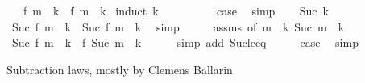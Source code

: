 \begin{isabellebody}
\ \ \ {\isachardoublequoteopen}f\ m\ {\isacharplus}{\kern0pt}\ k\ {\isasymle}\ f\ {\isacharparenleft}{\kern0pt}m\ {\isacharplus}{\kern0pt}\ k{\isacharparenright}{\kern0pt}{\isachardoublequoteclose}\isanewline
%
\isadelimproof
%
\endisadelimproof
%
\isatagproof
{}\isamarkupfalse%
\ {\isacharparenleft}{\kern0pt}induct\ k{\isacharparenright}{\kern0pt}\isanewline
\ \ \isamarkupfalse%
\ {}\isanewline
\ \ \isamarkupfalse%
\ \isamarkupfalse%
\ {\isacharquery}{\kern0pt}case\ \isamarkupfalse%
\ simp\isanewline
{}\isamarkupfalse%
\isanewline
\ \ \isamarkupfalse%
\ {\isacharparenleft}{\kern0pt}Suc\ k{\isacharparenright}{\kern0pt}\isanewline
\ \ \isamarkupfalse%
\ \isamarkupfalse%
\ {\isachardoublequoteopen}Suc\ {\isacharparenleft}{\kern0pt}f\ m\ {\isacharplus}{\kern0pt}\ k{\isacharparenright}{\kern0pt}\ {\isasymle}\ Suc\ {\isacharparenleft}{\kern0pt}f\ {\isacharparenleft}{\kern0pt}m\ {\isacharplus}{\kern0pt}\ k{\isacharparenright}{\kern0pt}{\isacharparenright}{\kern0pt}{\isachardoublequoteclose}\ \isamarkupfalse%
\ simp\isanewline
\ \ \isamarkupfalse%
\ \isamarkupfalse%
\ assms\ {\isacharbrackleft}{\kern0pt}of\ {\isachardoublequoteopen}m\ {\isacharplus}{\kern0pt}\ k{\isachardoublequoteclose}\ {\isachardoublequoteopen}Suc\ {\isacharparenleft}{\kern0pt}m\ {\isacharplus}{\kern0pt}\ k{\isacharparenright}{\kern0pt}{\isachardoublequoteclose}{\isacharbrackright}{\kern0pt}\ \isamarkupfalse%
\ {\isachardoublequoteopen}Suc\ {\isacharparenleft}{\kern0pt}f\ {\isacharparenleft}{\kern0pt}m\ {\isacharplus}{\kern0pt}\ k{\isacharparenright}{\kern0pt}{\isacharparenright}{\kern0pt}\ {\isasymle}\ f\ {\isacharparenleft}{\kern0pt}Suc\ {\isacharparenleft}{\kern0pt}m\ {\isacharplus}{\kern0pt}\ k{\isacharparenright}{\kern0pt}{\isacharparenright}{\kern0pt}{\isachardoublequoteclose}\isanewline
\ \ \ \ \isamarkupfalse%
\ {\isacharparenleft}{\kern0pt}simp\ add{\isacharcolon}{\kern0pt}\ Suc{\isacharunderscore}{\kern0pt}le{\isacharunderscore}{\kern0pt}eq{\isacharparenright}{\kern0pt}\isanewline
\ \ \isamarkupfalse%
\ \isamarkupfalse%
\ {\isacharquery}{\kern0pt}case\ \isamarkupfalse%
\ simp\isanewline
{}\isamarkupfalse%
%
\endisatagproof
{\isafoldproof}%
%
\isadelimproof
%
\endisadelimproof
%
\begin{isamarkuptext}%
Subtraction laws, mostly by Clemens Ballarin%

\end{isamarkuptext}
\end{isabellebody}
